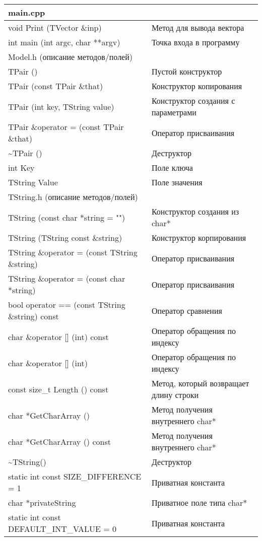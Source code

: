 \documentclass[pdf, unicode, 12pt, a4paper,oneside,fleqn]{article}
\begin{document}
\begin{longtable}{|p{8.4cm}|p{7.5cm}|}
\hline
\rowcolor{lightgray}
\multicolumn{2}{|c|} {main.cpp}\\
\hline
void Print (TVector \&inp)&Метод для вывода вектора\\
\hline
\hline
int main (int argc, char **argv)&Точка входа в программу\\
\hline
\rowcolor{lightgray}
\multicolumn{2}{|c|} {Model.h (описание методов/полей)}\\
\hline
TPair ()&Пустой конструктор\\
TPair (const TPair \&that)&Конструктор копирования\\
TPair (int key, TString value)&Конструктор создания с параметрами\\
\hline
\hline
TPair \&operator = (const TPair \&that)&Оператор присваивания\\
\hline
\hline \textasciitilde TPair ()&Деструктор\\ \hline
\hline int Key&Поле ключа\\ \hline
\hline
TString Value&Поле значения\\
\hline
\rowcolor{lightgray}
\multicolumn{2}{|c|} {TString.h (описание методов/полей)}\\
\hline
TString (const char *string = "")&Конструктор создания из char*\\
TString (TString const \&string)&Конструктор корпирования\\
\hline
\hline
TString \&operator = (const TString \&string)&Оператор присваивания\\
TString \&operator = (const char *string)&Оператор присваивания\\
\hline
\hline bool operator == (const TString \&string) const&Оператор сравнения\\ \hline
\hline char \&operator [] (int) const&Оператор обращения по индексу\\ \hline
\hline char \&operator [] (int)&Оператор обращения по индексу\\ \hline
\hline const size\_t Length () const&Метод, который возвращает длину строки \\ \hline
\hline char *GetCharArray ()&Метод получения внутреннего char*\\ \hline
\hline  char *GetCharArray () const&Метод получения внутреннего char*\\ \hline
\hline \textasciitilde TString()&Деструктор \\ \hline
\hline static int const SIZE\_DIFFERENCE = 1&Приватная константа \\ \hline
\hline char *privateString&Приватное поле типа char*\\ \hline
\hline static int const DEFAULT\_INT\_VALUE = 0&Приватная константа\\ \hline
\end{longtable}
\end{document}
